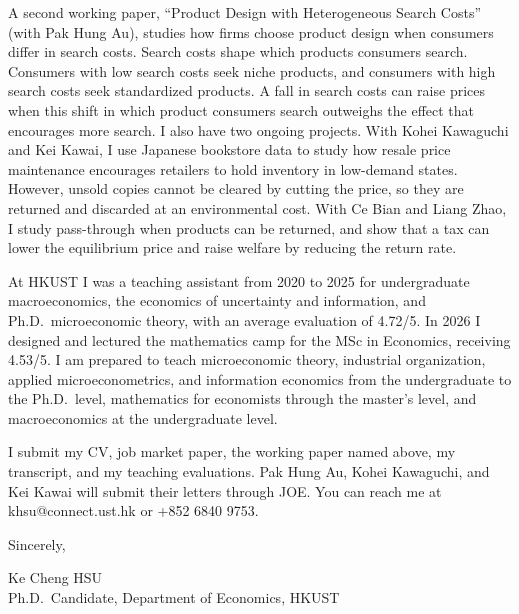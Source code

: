 \documentclass[11pt]{article}
\begin{document}
A second working paper, ``Product Design with Heterogeneous Search Costs'' (with Pak Hung Au), studies how firms choose product design when consumers differ in search costs. Search costs shape which products consumers search. Consumers with low search costs seek niche products, and consumers with high search costs seek standardized products. A fall in search costs can raise prices when this shift in which product consumers search outweighs the effect that encourages more search. I also have two ongoing projects. With Kohei Kawaguchi and Kei Kawai, I use Japanese bookstore data to study how resale price maintenance encourages retailers to hold inventory in low-demand states. However, unsold copies cannot be cleared by cutting the price, so they are returned and discarded at an environmental cost. With Ce Bian and Liang Zhao, I study pass-through when products can be returned, and show that a tax can lower the equilibrium price and raise welfare by reducing the return rate.

At HKUST I was a teaching assistant from 2020 to 2025 for undergraduate macroeconomics, the economics of uncertainty and information, and Ph.D.\ microeconomic theory, with an average evaluation of 4.72/5. In 2026 I designed and lectured the mathematics camp for the MSc in Economics, receiving 4.53/5. I am prepared to teach microeconomic theory, industrial organization, applied microeconometrics, and information economics from the undergraduate to the Ph.D.\ level, mathematics for economists through the master's level, and macroeconomics at the undergraduate level.

I submit my CV, job market paper, the working paper named above, my transcript, and my teaching evaluations. Pak Hung Au, Kohei Kawaguchi, and Kei Kawai will submit their letters through JOE. You can reach me at khsu@connect.ust.hk or +852 6840 9753.

\vspace{0.25em}
Sincerely,

\vspace{0.25em}
Ke Cheng HSU \\
Ph.D.\ Candidate, Department of Economics, HKUST
\end{document}
